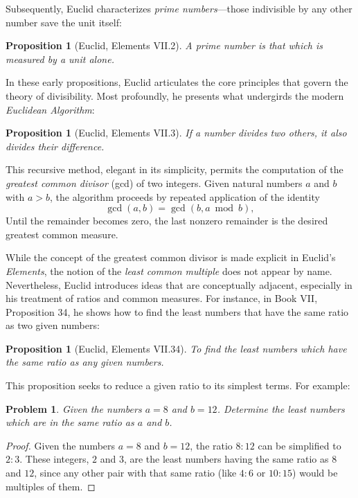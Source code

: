 \documentclass[11pt]{article}
\theoremstyle{plain}
\newtheorem{proposition}[theorem]{Proposition}
\newtheorem*{problem}{Problem}
\begin{document}
Subsequently, Euclid characterizes \emph{prime numbers}—those indivisible by any other number save the unit itself:

\begin{proposition}[Euclid, Elements VII.2]
A prime number is that which is measured by a unit alone.
\end{proposition}

In these early propositions, Euclid articulates the core principles that govern the theory of divisibility. Most profoundly, he presents what undergirds the modern \emph{Euclidean Algorithm}:

\begin{proposition}[Euclid, Elements VII.3]
If a number divides two others, it also divides their difference.
\end{proposition}

This recursive method, elegant in its simplicity, permits the computation of the \emph{greatest common divisor} (gcd) of two integers. Given natural numbers \( a \) and \( b \) with \( a > b \), the algorithm proceeds by repeated application of the identity
\[
\gcd(a, b) = \gcd(b, a \bmod b),
\]
Until the remainder becomes zero, the last nonzero remainder is the desired greatest common measure. 

\vspace{2mm}
While the concept of the greatest common divisor is made explicit in Euclid's \emph{Elements}, the notion of the \emph{least common multiple} does not appear by name. Nevertheless, Euclid introduces ideas that are conceptually adjacent, especially in his treatment of ratios and common measures. For instance, in Book VII, Proposition 34, he shows how to find the least numbers that have the same ratio as two given numbers:

\begin{proposition}[Euclid, Elements VII.34]
To find the least numbers which have the same ratio as any given numbers.
\end{proposition}

This proposition seeks to reduce a given ratio to its simplest terms. For example:
\begin{problem}
Given the numbers \( a = 8 \) and \( b = 12 \). Determine the least numbers which are in the same ratio as \( a \) and \( b \). 
\end{problem}

\begin{proof} 
Given the numbers \( a = 8 \) and \( b = 12 \), the ratio \( 8 : 12 \) can be simplified to \( 2 : 3 \). These integers, \( 2 \) and \( 3 \), are the least numbers having the same ratio as \( 8 \) and \( 12 \), since any other pair with that same ratio (like \( 4 : 6 \) or \( 10 : 15 \)) would be multiples of them.
\end{proof}
\end{document}
